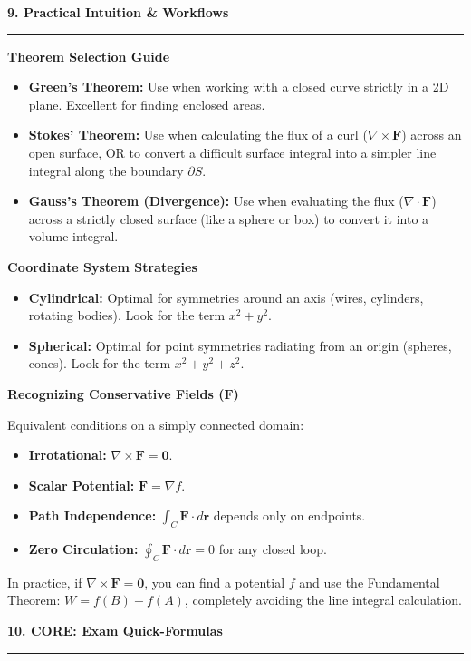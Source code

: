 \documentclass[10pt, landscape, twocolumn]{article}
\newcommand{\cheatsheetsection}[1]{
    \vspace{0.8em}
    {\color{themeblue}\large\bfseries #1} \par
    \vspace{-0.4em}
    {\color{themeblue}\rule{\linewidth}{1pt}} \par
    \vspace{0.3em}
}
\newcommand{\cheatsheetsubsection}[1]{
    \vspace{0.5em}
    {\color{themeblue}\normalsize\bfseries #1} \par
    \vspace{0.2em}
}
\begin{document}
\cheatsheetsection{9. Practical Intuition \& Workflows}

\cheatsheetsubsection{Theorem Selection Guide}
\begin{itemize}[leftmargin=*, nosep]
    \item \textbf{Green's Theorem:} Use when working with a closed curve strictly in a 2D plane. Excellent for finding enclosed areas.
    \item \textbf{Stokes' Theorem:} Use when calculating the flux of a curl ($\nabla \times \mathbf{F}$) across an open surface, OR to convert a difficult surface integral into a simpler line integral along the boundary $\partial S$.
    \item \textbf{Gauss's Theorem (Divergence):} Use when evaluating the flux ($\nabla \cdot \mathbf{F}$) across a strictly closed surface (like a sphere or box) to convert it into a volume integral.
\end{itemize}

\cheatsheetsubsection{Coordinate System Strategies}
\begin{itemize}[leftmargin=*, nosep]
    \item \textbf{Cylindrical:} Optimal for symmetries around an axis (wires, cylinders, rotating bodies). Look for the term $x^2 + y^2$.
    \item \textbf{Spherical:} Optimal for point symmetries radiating from an origin (spheres, cones). Look for the term $x^2 + y^2 + z^2$.
\end{itemize}

\cheatsheetsubsection{Recognizing Conservative Fields ($\mathbf{F}$)}
Equivalent conditions on a simply connected domain:
\begin{itemize}[leftmargin=*, nosep]
    \item \textbf{Irrotational:} $\nabla \times \mathbf{F} = \mathbf{0}$.
    \item \textbf{Scalar Potential:} $\mathbf{F} = \nabla f$.
    \item \textbf{Path Independence:} $\int_C \mathbf{F} \cdot d\mathbf{r}$ depends only on endpoints.
    \item \textbf{Zero Circulation:} $\oint_C \mathbf{F} \cdot d\mathbf{r} = 0$ for any closed loop.
\end{itemize}
In practice, if $\nabla \times \mathbf{F} = \mathbf{0}$, you can find a potential $f$ and use the Fundamental Theorem: $W = f(B) - f(A)$, completely avoiding the line integral calculation.

\cheatsheetsection{10. \textbf{CORE}: Exam Quick-Formulas}
\vspace{0.2em}
\renewcommand{\arraystretch}{1.4}
\end{document}
